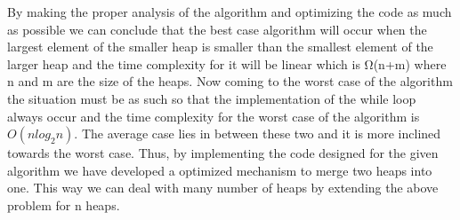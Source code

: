 \documentclass[conference]{IEEEtran}
\begin{document}
By making the proper analysis of the algorithm and optimizing the code as much as possible we can conclude that the best case algorithm will occur when the largest element of the smaller heap is smaller than the smallest element of the larger heap and the time complexity for it will be linear which is  Ω(n+m) where n and m are the size of the heaps. Now coming to the worst case of the algorithm the situation must be as such so that the implementation of the while loop always occur and the time complexity for the worst case of the algorithm is $O(nlog_{2}n)$. The average case lies in between these two and it is more inclined towards the worst case. Thus, by implementing the code designed for the given algorithm we have developed a optimized mechanism to merge two heaps into one. This way we can deal with many number of heaps by extending the above problem for n heaps.
\end{document}
